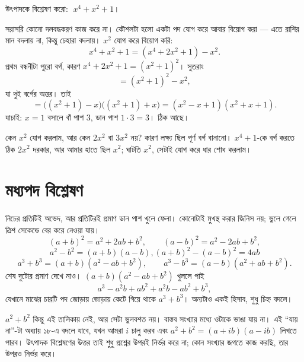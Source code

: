 \documentclass[11pt]{article}
\begin{document}
 উৎপাদকে বিশ্লেষণ করো: $\;x^{4} + x^{2} + 1$।

\begin{sol}
সরাসরি কোনো দলবদ্ধকরণ কাজ করে না। কৌশলটা হলো একটা পদ যোগ করে আবার বিয়োগ করা ---
এতে রাশির মান বদলায় না, কিন্তু চেহারা বদলায়। $x^{2}$ যোগ করে বিয়োগ করি:
\[
  x^{4} + x^{2} + 1 = (x^{4} + 2x^{2} + 1) - x^{2}.
\]
প্রথম বন্ধনীটা পুরো বর্গ, কারণ $x^{4} + 2x^{2} + 1 = (x^{2}+1)^{2}$। সুতরাং
\[
  = (x^{2}+1)^{2} - x^{2},
\]
যা দুই বর্গের অন্তর। তাই
\[
  = \big( (x^{2}+1) - x \big)\big( (x^{2}+1) + x \big)
  = (x^{2} - x + 1)(x^{2} + x + 1).
\]
যাচাই: $x = 1$ বসালে বাঁ পাশ $3$, ডান পাশ $1 \cdot 3 = 3$। ঠিক আছে।

কেন $x^{2}$ যোগ করলাম, আর কেন $2x^{2}$ বা $3x^{2}$ নয়? কারণ লক্ষ্য ছিল পূর্ণ বর্গ
বানানো। $x^{4} + 1$-কে বর্গ করতে ঠিক $2x^{2}$ দরকার, আর আমার হাতে ছিল $x^{2}$;
ঘাটতি $x^{2}$, সেটাই যোগ করে ধার শোধ করলাম।
\end{sol}

\section{মধ্যপদ বিশ্লেষণ}

\begin{idea}[পাঁচটি অভেদ, সবগুলোই বন্ধনী খুলে পাওয়া]
নিচের প্রতিটিই অভেদ, আর প্রতিটিরই প্রমাণ ডান পাশ খুলে ফেলা। কোনোটাই মুখস্থ করার
জিনিস নয়; ভুলে গেলে ত্রিশ সেকেন্ডে বের করে নেওয়া যায়।
\[
  (a+b)^{2} = a^{2} + 2ab + b^{2}, \qquad (a-b)^{2} = a^{2} - 2ab + b^{2},
\]
\[
  a^{2} - b^{2} = (a+b)(a-b), (a+b)^2-(a-b)^2=4ab
\]
\[
  a^{3} + b^{3} = (a+b)(a^{2} - ab + b^{2}), \qquad
  a^{3} - b^{3} = (a-b)(a^{2} + ab + b^{2}).
\]
শেষ দুটোর প্রমাণ দেখে নাও। $(a+b)(a^{2} - ab + b^{2})$ খুললে পাই
\[
  a^{3} - a^{2}b + ab^{2} + a^{2}b - ab^{2} + b^{3},
\]
যেখানে মাঝের চারটি পদ জোড়ায় জোড়ায় কেটে গিয়ে থাকে $a^{3} + b^{3}$। অন্যটাও একই
হিসাব, শুধু চিহ্ন বদলে।
\end{idea}

\begin{remark}
$a^{2} + b^{2}$ কিন্তু এই তালিকায় নেই, আর সেটা ভুলবশত নয়। বাস্তব সংখ্যার
মধ্যে ওটাকে ভাঙা যায় না। এই ``যায় না''-টা অধ্যায় ১৮-এ বদলে যাবে, যখন
আমরা $i$ চালু করব এবং $a^{2} + b^{2} = (a+ib)(a-ib)$ লিখতে পারব। উৎপাদক
বিশ্লেষণের উত্তর তাই শুধু প্রশ্নের উপরই নির্ভর করে না; কোন সংখ্যার জগতে কাজ করছি, তার উপরও নির্ভর করে।
\end{remark}
\end{document}
